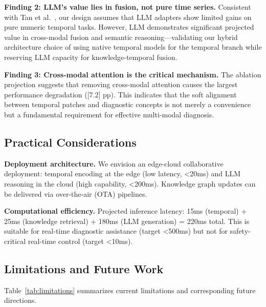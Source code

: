 \documentclass[11pt,a4paper]{article}
\begin{document}
\textbf{Finding 2: LLM's value lies in fusion, not pure time series.} Consistent with Tan et al.~\cite{tan2024llmts}, our design assumes that LLM adapters show limited gains on pure numeric temporal tasks. However, LLM demonstrates significant projected value in cross-modal fusion and semantic reasoning---validating our hybrid architecture choice of using native temporal models for the temporal branch while reserving LLM capacity for knowledge-temporal fusion.

\textbf{Finding 3: Cross-modal attention is the critical mechanism.} The ablation projection suggests that removing cross-modal attention causes the largest performance degradation ([7.2] pp). This indicates that the soft alignment between temporal patches and diagnostic concepts is not merely a convenience but a fundamental requirement for effective multi-modal diagnosis.

\subsection{Practical Considerations}\label{sec:disc:practical}

\textbf{Deployment architecture.} We envision an edge-cloud collaborative deployment: temporal encoding at the edge (low latency, <20ms) and LLM reasoning in the cloud (high capability, <200ms). Knowledge graph updates can be delivered via over-the-air (OTA) pipelines.

\textbf{Computational efficiency.} Projected inference latency: 15ms (temporal) + 25ms (knowledge retrieval) + 180ms (LLM generation) = 220ms total. This is suitable for real-time diagnostic assistance (target <500ms) but not for safety-critical real-time control (target <10ms).

\subsection{Limitations and Future Work}\label{sec:disc:limitations}

Table~\ref{tab:limitations} summarizes current limitations and corresponding future directions.
\end{document}
